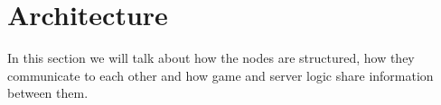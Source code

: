 \section{Architecture}

In this section we will talk about how the nodes are structured, how they communicate to each other and how game and server logic share information between them.